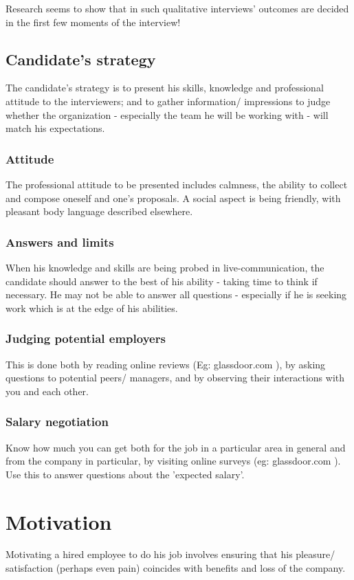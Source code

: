 \documentclass[oneside, article]{memoir}
\begin{document}
Research seems to show that in such qualitative interviews' outcomes are decided in the first few moments of the interview!

\subsection{Candidate's strategy}
The candidate's strategy is to present his skills, knowledge and professional attitude to the interviewers; and to gather information/ impressions to judge whether the organization - especially the team he will be working with - will match his expectations.

\subsubsection{Attitude}
The professional attitude to be presented includes calmness, the ability to collect and compose oneself and one's proposals. A social aspect is being friendly, with pleasant body language described elsewhere.

\subsubsection{Answers and limits}
When his knowledge and skills are being probed in live-communication, the candidate should answer to the best of his ability - taking time to think if necessary. He may not be able to answer all questions - especially if he is seeking work which is at the edge of his abilities.

\subsubsection{Judging potential employers}
This is done both by reading online reviews (Eg: glassdoor.com ), by asking questions to potential peers/ managers, and by observing their interactions with you and each other.

\subsubsection{Salary negotiation}
Know how much you can get both for the job in a particular area in general and from the company in particular, by visiting online surveys (eg: glassdoor.com ). Use this to answer questions about the 'expected salary'.

\section{Motivation}
Motivating a hired employee to do his job involves ensuring that his pleasure/ satisfaction (perhaps even pain) coincides with benefits and loss of the company. 
\end{document}

